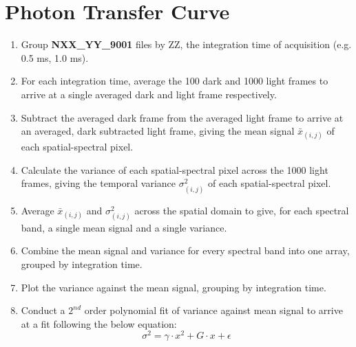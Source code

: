 \documentclass[nohyper,nobib]{tufte-book}
\begin{document}
\section{Photon Transfer Curve}
\begin{enumerate}
	\item Group \textbf{NXX\_YY\_9001} files by ZZ, the integration time of acquisition (e.g. 0.5 ms, 1.0 ms).
	\item For each integration time, average the 100 dark and 1000 light frames to arrive at a single averaged dark and light frame respectively.
	\item Subtract the averaged dark frame from the averaged light frame to arrive at an averaged, dark subtracted light frame, giving the mean signal $\bar{x}_{(i,j)}$ of each spatial-spectral pixel.
	\item Calculate the variance of each spatial-spectral pixel across the 1000 light frames, giving the temporal variance $\sigma^{2}_{(i,j)}$ of each spatial-spectral pixel.
	\item Average $\bar{x}_{(i,j)}$ and $\sigma^{2}_{(i,j)}$ across the spatial domain to give, for each spectral band, a single mean signal and a single variance.
	\item Combine the mean signal and variance for every spectral band into one array, grouped by integration time.
	\item Plot the variance against the mean signal, grouping by integration time.
	\item Conduct a $2^{nd}$ order polynomial fit of variance against mean signal to arrive at a fit following the below equation:
		\begin{equation}
			\sigma^{2} = \gamma \cdot x^{2} + G \cdot x + \epsilon
		\end{equation}
\end{enumerate}
\end{document}
